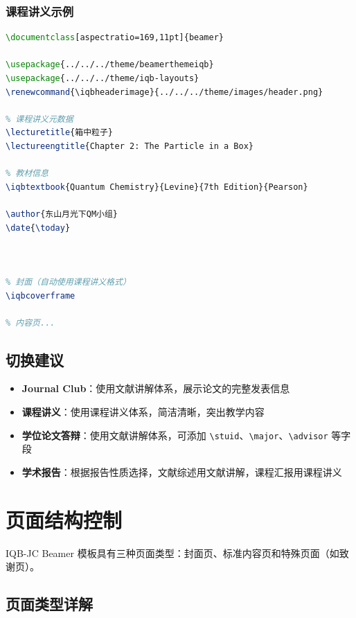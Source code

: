 \subsubsection{课程讲义示例}

\begin{lstlisting}[style=blockstyle,language=TeX]
% !TEX program = xelatex
\documentclass[aspectratio=169,11pt]{beamer}

\usepackage{../../../theme/beamerthemeiqb}
\usepackage{../../../theme/iqb-layouts}
\renewcommand{\iqbheaderimage}{../../../theme/images/header.png}

% 课程讲义元数据
\lecturetitle{箱中粒子}
\lectureengtitle{Chapter 2: The Particle in a Box}

% 教材信息
\iqbtextbook{Quantum Chemistry}{Levine}{7th Edition}{Pearson}

\author{东山月光下QM小组}
\date{\today}



% 封面（自动使用课程讲义格式）
\iqbcoverframe

% 内容页...

\end{lstlisting}

\subsection{切换建议}

\begin{itemize}
  \item \textbf{Journal Club}：使用文献讲解体系，展示论文的完整发表信息
  \item \textbf{课程讲义}：使用课程讲义体系，简洁清晰，突出教学内容
  \item \textbf{学位论文答辩}：使用文献讲解体系，可添加 \lstinline|\stuid|、\lstinline|\major|、\lstinline|\advisor| 等字段
  \item \textbf{学术报告}：根据报告性质选择，文献综述用文献讲解，课程汇报用课程讲义
\end{itemize}

\section{页面结构控制}

IQB-JC Beamer 模板具有三种页面类型：封面页、标准内容页和特殊页面（如致谢页）。

\subsection{页面类型详解}

